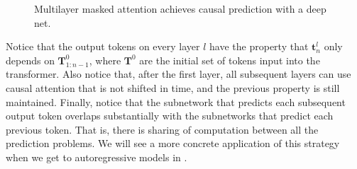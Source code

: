 \begin{figure}[h]
{\begin{minipage}{.49\linewidth}
        \end{minipage}
    }
    \caption{Multilayer masked attention achieves causal prediction with a deep net.}
    \label{fig:transformers:multilayer_masked_attention}
\end{figure}

Notice that the output tokens on every layer $l$ have the property that $\mathbf{t}^l_n$ only depends on $\mathbf{T}^0_{1:n-1}$, where $\mathbf{T}^0$ are the initial set of tokens input into the transformer. Also notice that, after the first layer, all subsequent layers can use causal attention that is not shifted in time, and the previous property is still maintained.
Finally, notice that the subnetwork that predicts each subsequent output token overlaps substantially with the subnetworks that predict each previous token. That is, there is sharing of computation between all the prediction problems. We will see a more concrete application of this strategy when we get to autoregressive models in \sect{\ref{sec:generative_models:autoregressive}}.

